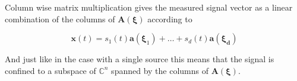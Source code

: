 \documentclass[11pt]{article}
\renewcommand{\vct}[1]{\boldsymbol{#1}}
\begin{document}
Column wise matrix multiplication gives the measured signal vector as a linear combination of the columns of $\vct{A}(\vct{\xi})$ according to

\begin{equation} \label{eq:5}
\vct{x}(t) = s_1(t)\vct{a}(\vct{\xi}_1) + \dots + s_d(t)\vct{a}(\vct{\xi_d})
\end{equation}

And just like in the case with a single source this means that the signal is confined to a subspace of $\mathbb C^n$ spanned by the columns of $\vct{A}(\vct{\xi})$.








\end{document}

